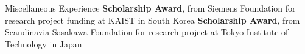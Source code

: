 \begin{rubric}{\faAward Miscellaneous Experience}
\entry*[2023] \textbf{Scholarship Award}, from Siemens Foundation for research project funding at KAIST in South Korea
%
\entry*[2020] \textbf{Scholarship Award}, from Scandinavia-Sasakawa Foundation for research project at Tokyo Institute of Technology in Japan
%
%
\end{rubric}